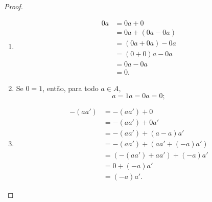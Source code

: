 \begin{proof}
	\begin{enumerate}
	\item
		\begin{align*}
		0 a &= 0 a + 0 \\
			&= 0 a + (0 a - 0 a) \\
			&= (0 a + 0 a) - 0 a \\
			&= (0+0) a - 0 a \\
			&= 0 a - 0 a \\
			&= 0.
		\end{align*}

	\item Se $0=1$, então, para todo $a \in A$,
		\begin{equation*}
		a = 1a = 0a = 0;
		\end{equation*}

	\item
		\begin{align*}
		-(a a') &= -(a a') + 0 \\
			&= -(a a') + 0 a' \\
			&= -(a a') + (a - a) a' \\
			&= -(a a') + (a a' + (-a) a') \\
			&= (-(a a') + a a') + (-a) a' \\
			&= 0 + (-a) a' \\
			&= (-a) a'.
		\end{align*}
	\end{enumerate}
\end{proof}


